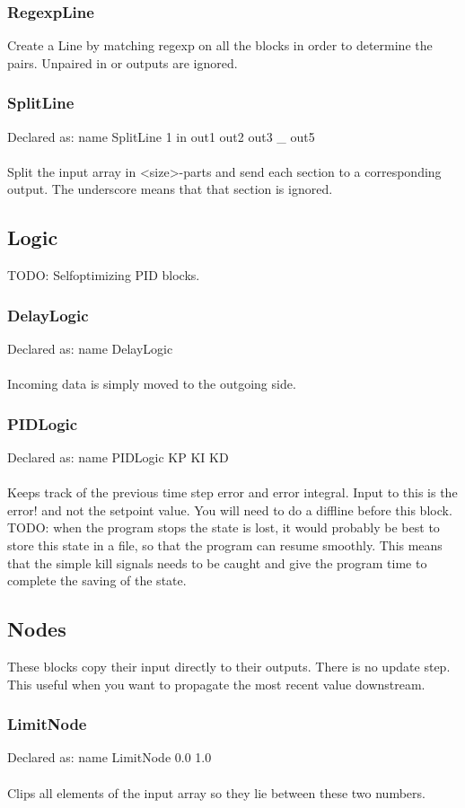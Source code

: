 \documentclass[a4paper]{article}
\begin{document}
\subsubsection{RegexpLine}
Create a Line by matching regexp on all the blocks in order to determine the pairs. Unpaired in or outputs are ignored.
\subsubsection{SplitLine}
Declared as: name SplitLine 1 in out1 out2 out3 \_ out5\\\\
Split the input array in <size>-parts and send each section to a corresponding output. The underscore means that that section is ignored.
\subsection{Logic}
TODO: Selfoptimizing PID blocks.
\subsubsection{DelayLogic}
Declared as: name DelayLogic\\\\
Incoming data is simply moved to the outgoing side.
\subsubsection{PIDLogic}
Declared as: name PIDLogic KP KI KD\\\\
Keeps track of the previous time step error and error integral. Input to this is the error! and not the setpoint value. You will need to do a diffline before this block. TODO: when the program stops the state is lost, it would probably be best to store this state in a file, so that the program can resume smoothly. This means that the simple kill signals needs to be caught and give the program time to complete the saving of the state.\\
\subsection{Nodes}
These blocks copy their input directly to their outputs. There is no update step. This useful when you want to propagate the most recent value downstream.
\subsubsection{LimitNode}
Declared as: name LimitNode 0.0 1.0\\\\
Clips all elements of the input array so they lie between these two numbers.
\end{document}
